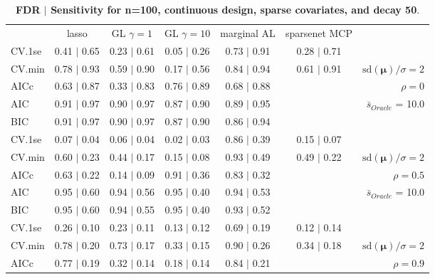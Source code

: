 \clearpage
\begin{table}\vspace{-.5cm}
\caption[l]{ {\it }
{ \bf FDR $\boldsymbol{\mid}$ Sensitivity for n=100, continuous design, sparse covariates, and  decay  50}.}
\vspace{-.5cm}
\footnotesize{}
\begin{center}
\begin{tabular}{l*{5}{c}|r}
 & lasso & GL $\gamma=1$ & GL $\gamma=10$ & marginal AL & sparsenet MCP  & \\
 \cline{1-7}
CV.1se & 0.41 $\mid$ 0.65 & 0.23 $\mid$ 0.61 & 0.05 $\mid$ 0.26 & 0.73 $\mid$ 0.91 & 0.28 $\mid$ 0.71 & \\
CV.min & 0.78 $\mid$ 0.93 & 0.59 $\mid$ 0.90 & 0.17 $\mid$ 0.56 & 0.84 $\mid$ 0.94 & 0.61 $\mid$ 0.91 &  $\mathrm{sd}(\mathbf{\mu})/\sigma=2$ \\
AICc & 0.63 $\mid$ 0.87 & 0.33 $\mid$ 0.83 & 0.76 $\mid$ 0.89 & 0.68 $\mid$ 0.88 & & $\rho=0$ \\
AIC & 0.91 $\mid$ 0.97 & 0.90 $\mid$ 0.97 & 0.87 $\mid$ 0.90 & 0.89 $\mid$ 0.95 & &  \multirow{2}{*}{$\bar{s}_{Oracle}$ = 10.0} \\
BIC & 0.91 $\mid$ 0.97 & 0.90 $\mid$ 0.97 & 0.87 $\mid$ 0.90 & 0.86 $\mid$ 0.94 & &  \\
 \hline 
CV.1se & 0.07 $\mid$ 0.04 & 0.06 $\mid$ 0.04 & 0.02 $\mid$ 0.03 & 0.86 $\mid$ 0.39 & 0.15 $\mid$ 0.07 & \\
CV.min & 0.60 $\mid$ 0.23 & 0.44 $\mid$ 0.17 & 0.15 $\mid$ 0.08 & 0.93 $\mid$ 0.49 & 0.49 $\mid$ 0.22 &  $\mathrm{sd}(\mathbf{\mu})/\sigma=2$ \\
AICc & 0.63 $\mid$ 0.22 & 0.14 $\mid$ 0.09 & 0.91 $\mid$ 0.36 & 0.83 $\mid$ 0.32 & & $\rho=0.5$ \\
AIC & 0.95 $\mid$ 0.60 & 0.94 $\mid$ 0.56 & 0.95 $\mid$ 0.40 & 0.94 $\mid$ 0.53 & &  \multirow{2}{*}{$\bar{s}_{Oracle}$ = 10.0} \\
BIC & 0.95 $\mid$ 0.60 & 0.94 $\mid$ 0.55 & 0.95 $\mid$ 0.40 & 0.93 $\mid$ 0.52 & &  \\
 \hline 
CV.1se & 0.26 $\mid$ 0.10 & 0.23 $\mid$ 0.11 & 0.13 $\mid$ 0.12 & 0.69 $\mid$ 0.19 & 0.12 $\mid$ 0.14 & \\
CV.min & 0.78 $\mid$ 0.20 & 0.73 $\mid$ 0.17 & 0.33 $\mid$ 0.15 & 0.90 $\mid$ 0.26 & 0.34 $\mid$ 0.18 &  $\mathrm{sd}(\mathbf{\mu})/\sigma=2$ \\
AICc & 0.77 $\mid$ 0.19 & 0.32 $\mid$ 0.14 & 0.18 $\mid$ 0.14 & 0.84 $\mid$ 0.21 & & $\rho=0.9$ \\

\end{tabular}
\end{center}
\end{table}

